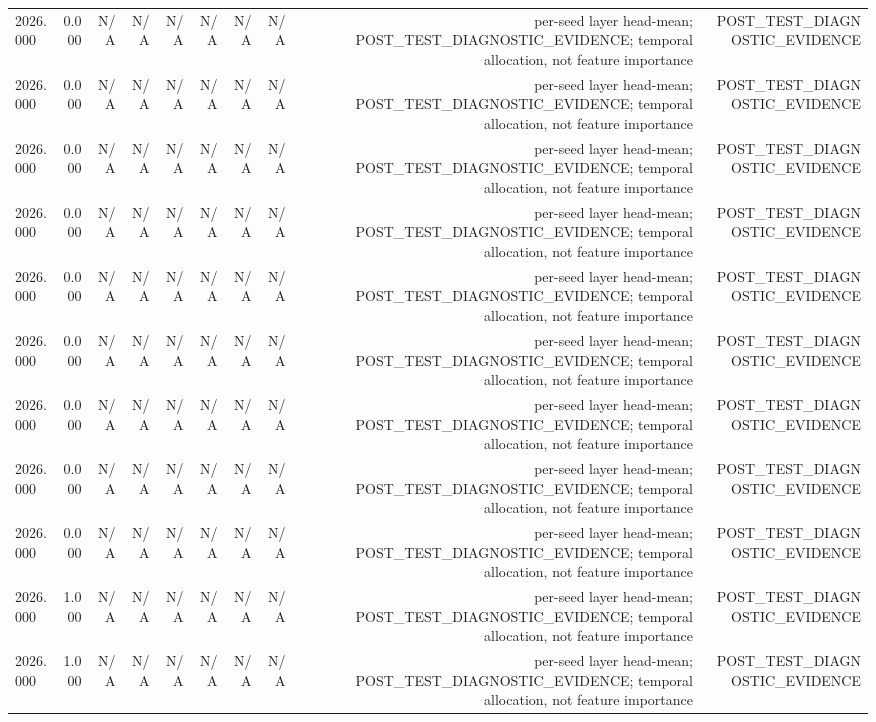 \begin{table}[h!]
\begin{tabular}{lrrrrrrrrr}
2026.000 & 0.000 & N/A & N/A & N/A & N/A & N/A & N/A & per-seed layer head-mean; POST\_TEST\_DIAGNOSTIC\_EVIDENCE; temporal allocation, not feature importance & POST\_TEST\_DIAGNOSTIC\_EVIDENCE \\
2026.000 & 0.000 & N/A & N/A & N/A & N/A & N/A & N/A & per-seed layer head-mean; POST\_TEST\_DIAGNOSTIC\_EVIDENCE; temporal allocation, not feature importance & POST\_TEST\_DIAGNOSTIC\_EVIDENCE \\
2026.000 & 0.000 & N/A & N/A & N/A & N/A & N/A & N/A & per-seed layer head-mean; POST\_TEST\_DIAGNOSTIC\_EVIDENCE; temporal allocation, not feature importance & POST\_TEST\_DIAGNOSTIC\_EVIDENCE \\
2026.000 & 0.000 & N/A & N/A & N/A & N/A & N/A & N/A & per-seed layer head-mean; POST\_TEST\_DIAGNOSTIC\_EVIDENCE; temporal allocation, not feature importance & POST\_TEST\_DIAGNOSTIC\_EVIDENCE \\
2026.000 & 0.000 & N/A & N/A & N/A & N/A & N/A & N/A & per-seed layer head-mean; POST\_TEST\_DIAGNOSTIC\_EVIDENCE; temporal allocation, not feature importance & POST\_TEST\_DIAGNOSTIC\_EVIDENCE \\
2026.000 & 0.000 & N/A & N/A & N/A & N/A & N/A & N/A & per-seed layer head-mean; POST\_TEST\_DIAGNOSTIC\_EVIDENCE; temporal allocation, not feature importance & POST\_TEST\_DIAGNOSTIC\_EVIDENCE \\
2026.000 & 0.000 & N/A & N/A & N/A & N/A & N/A & N/A & per-seed layer head-mean; POST\_TEST\_DIAGNOSTIC\_EVIDENCE; temporal allocation, not feature importance & POST\_TEST\_DIAGNOSTIC\_EVIDENCE \\
2026.000 & 0.000 & N/A & N/A & N/A & N/A & N/A & N/A & per-seed layer head-mean; POST\_TEST\_DIAGNOSTIC\_EVIDENCE; temporal allocation, not feature importance & POST\_TEST\_DIAGNOSTIC\_EVIDENCE \\
2026.000 & 0.000 & N/A & N/A & N/A & N/A & N/A & N/A & per-seed layer head-mean; POST\_TEST\_DIAGNOSTIC\_EVIDENCE; temporal allocation, not feature importance & POST\_TEST\_DIAGNOSTIC\_EVIDENCE \\
2026.000 & 1.000 & N/A & N/A & N/A & N/A & N/A & N/A & per-seed layer head-mean; POST\_TEST\_DIAGNOSTIC\_EVIDENCE; temporal allocation, not feature importance & POST\_TEST\_DIAGNOSTIC\_EVIDENCE \\
2026.000 & 1.000 & N/A & N/A & N/A & N/A & N/A & N/A & per-seed layer head-mean; POST\_TEST\_DIAGNOSTIC\_EVIDENCE; temporal allocation, not feature importance & POST\_TEST\_DIAGNOSTIC\_EVIDENCE \\

\end{tabular}
\end{table}
